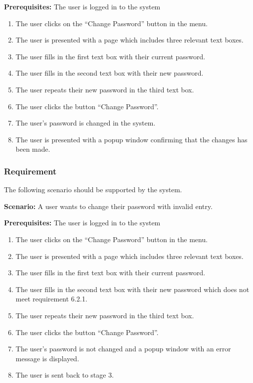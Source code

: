 \documentclass{article}
\begin{document}
\textbf{Prerequisites:} The user is logged in to the system

\begin{enumerate}
    \item The user clicks on the “Change Password” button in the menu.
    \item The user is presented with a page which includes three relevant text boxes.
    \item The user fills in the first text box with their current password.
    \item The user fills in the second text box with their new password.
    \item The user repeats their new password in the third text box.
    \item The user clicks the button “Change Password”.
    \item The user's password is changed in the system.
    \item The user is presented with a popup window confirming that the changes has been made.
\end{enumerate}



\subsubsection{Requirement}
The following scenario should be supported by the system.

\textbf{Scenario:} A user wants to change their password with invalid entry.

\textbf{Prerequisites:} The user is logged in to the system

\begin{enumerate}
    \item The user clicks on the “Change Password” button in the menu.
    \item The user is presented with a page which includes three relevant text boxes.
    \item The user fills in the first text box with their current password.
    \item The user fills in the second text box with their new password which does not meet requirement 6.2.1.
    \item The user repeats their new password in the third text box.
    \item The user clicks the button “Change Password”.
    \item The user's password is not changed and a popup window with an error message is displayed.
    \item The user is sent back to stage 3.
\end{enumerate}
\end{document}

